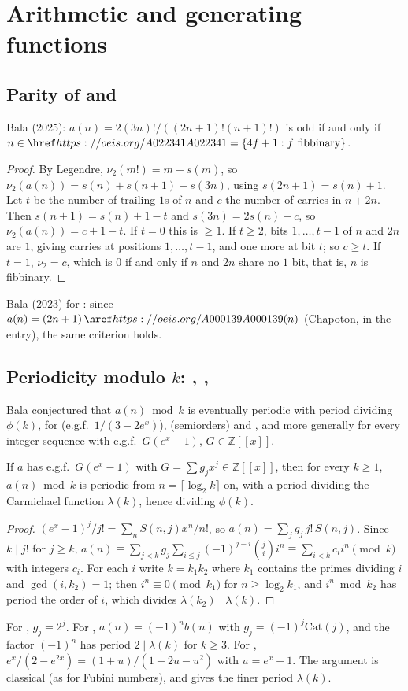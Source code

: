 \section{Arithmetic and generating functions}\label{s:arith}
\subsection{Parity of  and }\label{s:A000139}
Bala (2025): $a(n)=2(3n)!/((2n+1)!(n+1)!)$ is odd if and only if $n\in\oeis{A022341}=\{4f+1:f\text{ fibbinary}\}$.
\begin{proof} By Legendre, $\nu_2(m!)=m-s(m)$, so $\nu_2(a(n))=s(n)+s(n+1)-s(3n)$, using $s(2n+1)=s(n)+1$. Let $t$ be the
number of trailing $1$s of $n$ and $c$ the number of carries in $n+2n$. Then $s(n+1)=s(n)+1-t$ and
$s(3n)=2s(n)-c$, so $\nu_2(a(n))=c+1-t$. If $t=0$ this is $\ge1$. If $t\ge2$, bits $1,\dots,t-1$ of $n$ and $2n$ are $1$,
giving carries at positions $1,\dots,t-1$, and one more at bit $t$; so $c\ge t$. If $t=1$, $\nu_2=c$, which is $0$ if
and only if $n$ and $2n$ share no $1$ bit, that is, $n$ is fibbinary. \end{proof}
Bala (2023) for : since $a(n)=(2n+1)\,\oeis{A000139}(n)$ (Chapoton, in the entry), the same
criterion holds.

\subsection{Periodicity modulo \texorpdfstring{$k$}{k}: , , }\label{s:A004123}
Bala conjectured that $a(n)\bmod k$ is eventually periodic with period dividing $\phi(k)$, for 
(e.g.f.\ $1/(3-2e^x)$),  (semiorders) and , and more generally for every integer
sequence with e.g.f.\ $G(e^x-1)$, $G\in\mathbb{Z}[[x]]$.
\begin{theorem} If $a$ has e.g.f.\ $G(e^x-1)$ with $G=\sum g_jx^j\in\mathbb{Z}[[x]]$, then for every $k\ge1$,
$a(n)\bmod k$ is periodic from $n=\lceil\log_2k\rceil$ on, with a period dividing the Carmichael function
$\lambda(k)$, hence dividing $\phi(k)$.\end{theorem}
\begin{proof} $(e^x-1)^j/j!=\sum_nS(n,j)x^n/n!$, so $a(n)=\sum_jg_j\,j!\,S(n,j)$. Since $k\mid j!$ for $j\ge k$,
$a(n)\equiv\sum_{j<k}g_j\sum_{i\le j}(-1)^{j-i}\binom jii^n\equiv\sum_{i<k}c_ii^n\pmod k$ with integers $c_i$. For each
$i$ write $k=k_1k_2$ where $k_1$ contains the primes dividing $i$ and $\gcd(i,k_2)=1$; then $i^n\equiv0\pmod{k_1}$
for $n\ge\log_2k_1$, and $i^n\bmod k_2$ has period the order of $i$, which divides $\lambda(k_2)\mid\lambda(k)$.
\end{proof}
For , $g_j=2^j$. For , $a(n)=(-1)^nb(n)$ with $g_j=(-1)^j\mathrm{Cat}(j)$, and the factor
$(-1)^n$ has period $2\mid\lambda(k)$ for $k\ge3$. For , $e^x/(2-e^{2x})=(1+u)/(1-2u-u^2)$ with
$u=e^x-1$. The argument is classical (as for Fubini numbers), and gives the finer period $\lambda(k)$.

